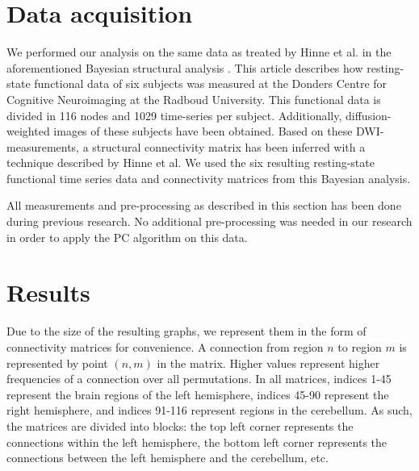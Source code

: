 \documentclass[a4paper, 10pt, english, onecolumn]{article}
\begin{document}
\section{Data acquisition}\label{sec:data}
We performed our analysis on the same data as treated by Hinne et al. in the aforementioned Bayesian structural analysis \cite{hinne2013, hinne2013structfunc}.
This article describes how resting-state functional data of six subjects was measured at the Donders Centre for Cognitive Neuroimaging at the Radboud University.
This functional data is divided in 116 nodes and 1029 time-series per subject.
Additionally, diffusion-weighted images of these subjects have been obtained.
Based on these DWI-measurements, a structural connectivity matrix has been inferred with a technique described by Hinne et al.
We used the six resulting resting-state functional time series data and connectivity matrices from this Bayesian analysis.

All measurements and pre-processing as described in this section has been done during previous research. No additional pre-processing was needed in our research in order to apply the PC algorithm on this data.

\section{Results}\label{sec:results}
Due to the size of the resulting graphs, we represent them in the form of connectivity matrices for convenience.
A connection from region $n$ to region $m$ is represented by point $(n,m)$ in the matrix.
Higher values represent higher frequencies of a connection over all permutations.
In all matrices, indices 1-45 represent the brain regions of the left hemisphere, indices 45-90 represent the right hemisphere, and indices 91-116 represent regions in the cerebellum.
As such, the matrices are divided into blocks: the top left corner represents the connections within the left hemisphere, the bottom left corner represents the connections between the left hemisphere and the cerebellum, etc.
\end{document}
